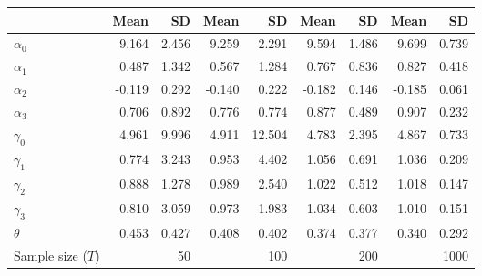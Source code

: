
\begin{tabular}[t]{lrrrrrrrr}
\toprule
  & Mean & SD & Mean  & SD  & Mean   & SD   & Mean    & SD   \\
\midrule
$\alpha_{0}$ & 9.164 & 2.456 & 9.259 & 2.291 & 9.594 & 1.486 & 9.699 & 0.739\\
$\alpha_{1}$ & 0.487 & 1.342 & 0.567 & 1.284 & 0.767 & 0.836 & 0.827 & 0.418\\
$\alpha_{2}$ & -0.119 & 0.292 & -0.140 & 0.222 & -0.182 & 0.146 & -0.185 & 0.061\\
$\alpha_{3}$ & 0.706 & 0.892 & 0.776 & 0.774 & 0.877 & 0.489 & 0.907 & 0.232\\
$\gamma_{0}$ & 4.961 & 9.996 & 4.911 & 12.504 & 4.783 & 2.395 & 4.867 & 0.733\\
$\gamma_{1}$ & 0.774 & 3.243 & 0.953 & 4.402 & 1.056 & 0.691 & 1.036 & 0.209\\
$\gamma_{2}$ & 0.888 & 1.278 & 0.989 & 2.540 & 1.022 & 0.512 & 1.018 & 0.147\\
$\gamma_{3}$ & 0.810 & 3.059 & 0.973 & 1.983 & 1.034 & 0.603 & 1.010 & 0.151\\
$\theta$ & 0.453 & 0.427 & 0.408 & 0.402 & 0.374 & 0.377 & 0.340 & 0.292\\
Sample size ($T$) &  & 50 &  & 100 &  & 200 &  & 1000\\
\bottomrule
\end{tabular}
